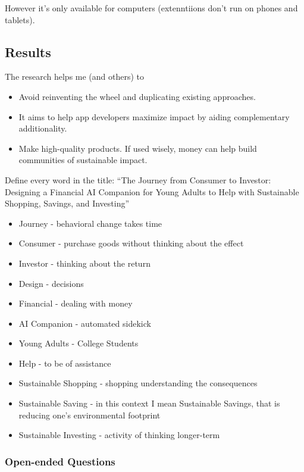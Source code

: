 \documentclass[
  letterpaper,
  DIV=11,
  numbers=noendperiod]{scrartcl}
\providecommand{\tightlist}{%
  \setlength{\itemsep}{0pt}\setlength{\parskip}{0pt}}\usepackage{longtable,booktabs,array}
\begin{document}
However it's only available for computers (extenntiions don't run on
phones and tablets).

\subsection{Results}\label{results-1}

The research helps me (and others) to

\begin{itemize}
\item
  Avoid reinventing the wheel and duplicating existing approaches.
\item
  It aims to help app developers maximize impact by aiding complementary
  additionality.
\item
  Make high-quality products. If used wisely, money can help build
  communities of sustainable impact.
\end{itemize}

Define every word in the title: ``The Journey from Consumer to Investor:
Designing a Financial AI Companion for Young Adults to Help with
Sustainable Shopping, Savings, and Investing''

\begin{itemize}
\tightlist
\item
  Journey - behavioral change takes time
\item
  Consumer - purchase goods without thinking about the effect
\item
  Investor - thinking about the return
\item
  Design - decisions
\item
  Financial - dealing with money
\item
  AI Companion - automated sidekick
\item
  Young Adults - College Students
\item
  Help - to be of assistance
\item
  Sustainable Shopping - shopping understanding the consequences
\item
  Sustainable Saving - in this context I mean Sustainable Savings, that
  is reducing one's environmental footprint
\item
  Sustainable Investing - activity of thinking longer-term
\end{itemize}

\subsubsection{Open-ended Questions}\label{open-ended-questions}
\end{document}
